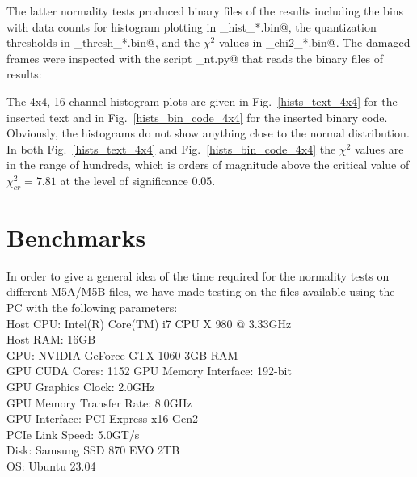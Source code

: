 \documentclass[letterpaper,twoside,12pt]{article}
\begin{document}
The latter normality tests produced binary files of the results including the bins with data counts for histogram plotting in \verb@nt_hist_*.bin@, the quantization thresholds in \verb@nt_thresh_*.bin@, and the $\chi^2$ values in \verb@nt_chi2_*.bin@. The damaged frames were inspected with the script \verb@inspect_nt.py@ that reads the binary files of results: \\

\noindent \verb@%run inspect_nt.py rd1910_wz_268-1811_bin_code.m5b 067  2000 1@ \\
\noindent \verb@%run inspect_nt.py rd1910_wz_268-1811_text.m5b 056  5006 1@. \\


The 4x4, 16-channel histogram plots are given in Fig.~\ref{hists_text_4x4} for the inserted text and in Fig.~\ref{hists_bin_code_4x4} for the inserted binary code. Obviously, the histograms do not show anything close to the normal distribution. In both Fig.~\ref{hists_text_4x4} and Fig.~\ref{hists_bin_code_4x4} the $\chi^2$ values are in the range of hundreds, which is orders of magnitude above the critical value of $\chi^2_{cr} = 7.81$ at the level of significance 0.05. 



\section{Benchmarks}

In order to give a general idea of the time required for the normality tests on different M5A/M5B files, we have made testing on the files available using the PC with the following parameters: \\

\indent Host CPU: Intel(R) Core(TM) i7 CPU X 980 @ 3.33GHz \\
\indent Host RAM: 16GB \\
\indent GPU: NVIDIA GeForce GTX 1060 3GB RAM \\
\indent GPU CUDA Cores: 1152
\indent GPU Memory Interface: 192-bit \\
\indent GPU Graphics Clock: 2.0GHz \\
\indent GPU Memory Transfer Rate: 8.0GHz \\
\indent GPU Interface: PCI Express x16 Gen2 \\
\indent PCIe Link Speed: 5.0GT/s \\
\indent Disk: Samsung SSD 870 EVO 2TB \\
\indent OS: Ubuntu 23.04 \\
\end{document}
